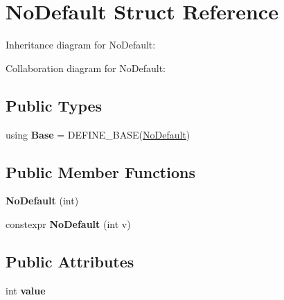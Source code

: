\hypertarget{struct_no_default}{}\section{No\+Default Struct Reference}
\label{struct_no_default}


Inheritance diagram for No\+Default\+:


Collaboration diagram for No\+Default\+:
\subsection*{Public Types}
\begin{DoxyCompactItemize}
\item 
\mbox{\label{struct_no_default_aeaaefa43b7a0c7a6e8a294f6ffcaacde}} 
using {\bfseries Base} = D\+E\+F\+I\+N\+E\+\_\+\+B\+A\+SE(\mbox{\hyperlink{struct_no_default}{No\+Default}})
\end{DoxyCompactItemize}
\subsection*{Public Member Functions}
\begin{DoxyCompactItemize}
\item 
\mbox{\label{struct_no_default_a6119654bbe78eec67d24956bde0d0305}} 
{\bfseries No\+Default} (int)
\item 
\mbox{\label{struct_no_default_aeecc956ecd91c8fe58c3fc449eff261b}} 
constexpr {\bfseries No\+Default} (int v)
\end{DoxyCompactItemize}
\subsection*{Public Attributes}
\begin{DoxyCompactItemize}
\item 
\mbox{\label{struct_no_default_aaa0d301bcb4d63d2b0b9d99afe9e2b90}} 
int {\bfseries value}
\end{DoxyCompactItemize}


